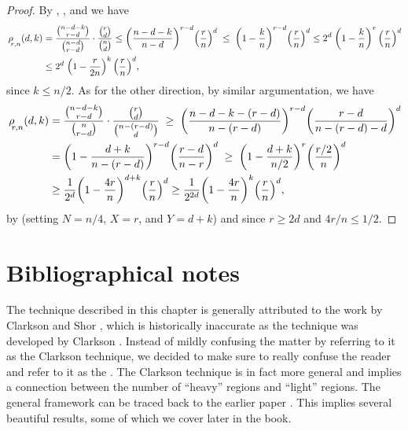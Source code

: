 \begin{proof}
    By , , and
     we have
    \begin{align*}
        \CSProbFull{r}{d}{k}{n}%
      & =%
        \frac{\binom{n-d-k}{r-d}} {\binom{n-d}{r-d}} \cdot
        \frac{\binom{r}{d}} {\binom{n}{d}}%
        \leq%
        \pth{ \frac{n-d-k}{n-d} }^{r-d} \pth{\frac{r}{n}}^d \;\leq\;
        \pth{ 1 - \frac{k}{n} }^{r-d} \pth{\frac{r}{n}}^d \leq 2^{d}
        \; \pth{ 1 - \frac{k}{n} }^{r} \,\pth{\frac{r}{n}}^d
        \\
        & \leq 2^{d} \; \pth{ 1 - \frac{r}{2 n} }^{k}
        \,\pth{\frac{r}{n}}^d,
    \end{align*}
    since $k \leq n/2$. As for the other direction, by similar
    argumentation, we have
    \begin{align*}
        \CSProbFull{r}{d}{k}{n}%
        &=%
        \frac{\binom{n-d-k}{r-d}}{\binom{n}{r-d}} \cdot
        \frac{\binom{r}{d}}{\binom{n-(r-d)}{d}}%
        \;\geq\;
        \pth{ \frac{n - d-k - (r-d)}{n-(r-d)} }^{r-d}
        \pth{\frac{r-d}{n-(r-d)-d}}^d\\
        & =%
        \pth{ 1 - \frac{d+k}{n-(r-d)} }^{r-d}
        \pth{\frac{r-d}{n-r}}^d \;\geq\; \pth{ 1 - \frac{d+k}{n/2}
        }^{r} \pth{\frac{r/2}{n}}^d \\%
        & \geq%
        \frac{1}{2^d} \pth{ 1 - \frac{4 r}{n} }^{d+k}
        \pth{\frac{r}{n}}^d%
        \geq%
        \frac{1}{2^{2d}} \pth{ 1 - \frac{4 r}{n} }^{k}
        \pth{\frac{r}{n}}^d,
    \end{align*}
    by  (setting $N=n/4$, $X=r$, and $Y=d+k$)
    and since $r \geq 2d$ and $4r/n \leq 1/2$.
\end{proof}




\section{Bibliographical notes}

The technique described in this chapter is generally attributed to the
work by Clarkson and Shor \cite{cs-arscg-89}, which is historically
inaccurate as the technique was developed by Clarkson
\cite{c-arscg-88}. Instead of mildly confusing the matter by referring
to it as the Clarkson technique, we decided to make sure to really
confuse the reader and refer to it as the . The Clarkson technique \cite{c-arscg-88} is in fact
more general and implies a connection between the number of ``heavy''
regions and ``light'' regions. The general framework can be traced
back to the earlier paper \cite{c-narsc-87}. This implies several
beautiful results, some of which we cover later in the book.

